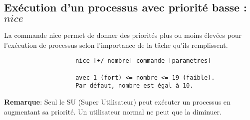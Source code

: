 		\subsection{Exécution d'un processus avec priorité basse : $nice$}
			La commande nice permet de donner des priorités plus ou moins élevées pour l'exécution de processus selon l'importance de la tâche qu'ils remplissent.

				\begin{verbatim}
					nice [+/-nombre] commande [parametres]
	
					avec 1 (fort) <= nombre <= 19 (faible). 
					Par défaut, nombre est égal à 10.
				\end{verbatim}		
				\textbf{Remarque}: Seul le SU (Super Utilisateur) peut exécuter un processus en augmentant sa priorité. Un utilisateur normal ne peut que la diminuer.



		
			


						


